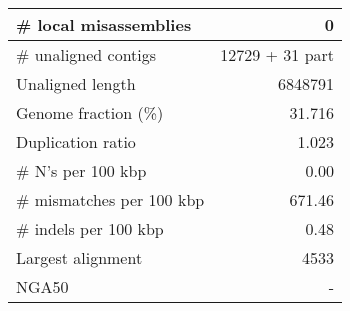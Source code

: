\documentclass[12pt,a4paper]{article}
\begin{document}
\begin{table}[ht]
\begin{center}
\begin{tabular}{|l*{1}{|r}|}
\# local misassemblies & 0 \\ \hline
\# unaligned contigs & 12729 + 31 part \\ \hline
Unaligned length & 6848791 \\ \hline
Genome fraction (\%) & 31.716 \\ \hline
Duplication ratio & 1.023 \\ \hline
\# N's per 100 kbp & 0.00 \\ \hline
\# mismatches per 100 kbp & 671.46 \\ \hline
\# indels per 100 kbp & 0.48 \\ \hline
Largest alignment & 4533 \\ \hline
NGA50 & - \\ \hline
\end{tabular}
\end{center}
\end{table}
\end{document}
